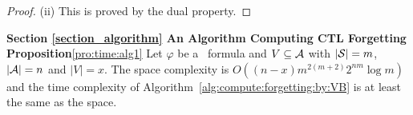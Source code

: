 \documentclass{article}
\begin{document}
\begin{proof}
 (ii) This is proved by the dual property.
 \end{proof}




 \noindent\textbf{Section \ref{section_algorithm} An Algorithm Computing CTL Forgetting}\\

 \noindent\textbf{Proposition}\ref{pro:time:alg1} Let $\varphi$ be a \CTL\ formula and $V\subseteq {\cal A}$ with $|{\cal S}|=m$, $|{\cal A}|=n$ and $|V|=x$. The space complexity is $O((n-x)m^{2(m+2)}2^{nm}  \log m)$ and the time complexity of Algorithm~\ref{alg:compute:forgetting:by:VB} is at least the same as the space.%
\end{document}
